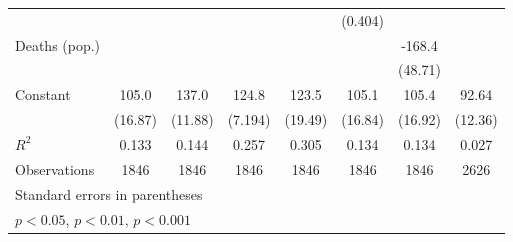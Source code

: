 \documentclass{article}
\begin{document}
{\begin{longtable}{l*{7}{c}}
                &                  &                  &                  &                  &  (0.404)         &                  &                  \\
Deaths (pop.)   &                  &                  &                  &                  &                  &   -168.4\sym{**} &                  \\
                &                  &                  &                  &                  &                  &  (48.71)         &                  \\
Constant        &    105.0\sym{***}&    137.0\sym{***}&    124.8\sym{***}&    123.5\sym{***}&    105.1\sym{***}&    105.4\sym{***}&    92.64\sym{***}\\
                &  (16.87)         &  (11.88)         &  (7.194)         &  (19.49)         &  (16.84)         &  (16.92)         &  (12.36)         \\
\hline
\(R^{2}\)       &    0.133         &    0.144         &    0.257         &    0.305         &    0.134         &    0.134         &    0.027         \\
Observations    &     1846         &     1846         &     1846         &     1846         &     1846         &     1846         &     2626         \\
\hline\hline
\multicolumn{8}{l}{\footnotesize Standard errors in parentheses}\\
\multicolumn{8}{l}{\footnotesize \sym{*} \(p<0.05\), \sym{**} \(p<0.01\), \sym{***} \(p<0.001\)}\\
\end{longtable}
}
\end{document}

